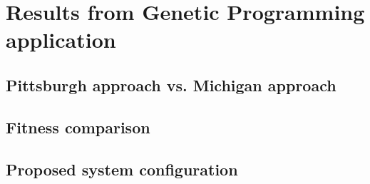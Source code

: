 \documentclass[a4paper,10pt,twocolumn,preprint,3p]{elsarticle}
\begin{document}

\section{Results from Genetic Programming application}
\label{sec:gp}

\subsection{Pittsburgh approach vs. Michigan approach}
\subsection{Fitness comparison}
\subsection{Proposed system configuration}


%
%
%
\end{document}
